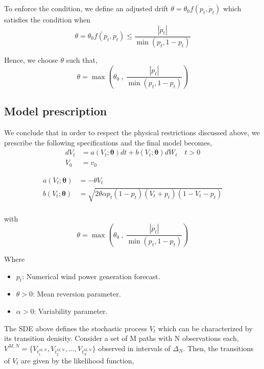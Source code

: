 \documentclass[10pt,twocolumn,letterpaper]{article}
\begin{document}
To enforce the condition, we  define an adjusted drift $\theta = \theta_0 f( p_t, \dot{p}_t) $  which satisfies the condition when
\begin{equation}
\theta = \theta_0 f( p_t, \dot{p}_t) \leq \frac{|\dot{p}_t|}{\min (p_t, 1-p_t)} 
\end{equation}

Hence, we choose $\theta$ such that,
\begin{equation}
\theta = \max \left( \theta_0 \ , \ \frac{|\dot{p}_t|}{\min (p_t, 1-p_t)}  \right )
\end{equation}
\subsection{Model prescription }
We conclude that in order to respect the physical restrictions discussed above, we prescribe the following specifications and the final model becomes,
\begin{equation}
\begin{split}
dV_t &= a(V_t; \bm{\theta}) dt + b (V_t; \bm{\theta} ) dW_t \quad t > 0 \\
V_0 & = v_0
\end{split}\label{main}
\end{equation}

\begin{equation}
\begin{split}
a(V_t; \bm{\theta}) &= - \theta V_t \\
b(V_t; \bm{\theta}) &=\sqrt{2 \theta \alpha p_t(1-p_t) (V_t +p_t ) (1-V_t-p_t)}  \\
\end{split}
\end{equation}

with
\begin{equation}
\theta = \max \left( \theta_0 \ , \ \frac{|\dot{p}_t|}{\min (p_t, 1-p_t)}  \right )
\end{equation}

Where 
\begin{itemize}
\item $p_t$: Numerical wind power generation forecast.
\item $\theta >0$: Mean reversion parameter.
\item $\alpha>0$: Variability parameter.
\end{itemize}

The  SDE above defines the stochastic process $V_t$ which can be characterized by its transition denisity. Consider a set of M paths with N observations each, $ V^{M,N}=\{ V_{t_1^{M,N}} , V_{t_2^{M,N}} ,\ldots , V_{t_N^{M,N}} \}$ observed in intervals of $\Delta_N$. Then, the transitions of $V_t$ are given by the likelihood function,
\end{document}
